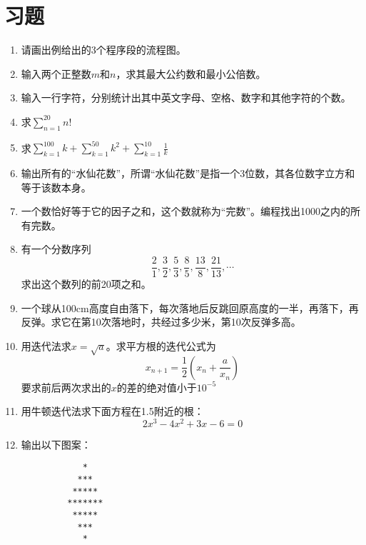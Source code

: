 \section{习题}
\begin{enumerate}
	\item 请画出例给出的3个程序段的流程图。
	\item 输入两个正整数$m$和$n$，求其最大公约数和最小公倍数。
	\item 输入一行字符，分别统计出其中英文字母、空格、数字和其他字符的个数。
	\item 求$\sum\limits_{n=1}^{20}n!$
	\item 求$\sum\limits_{k=1}^100 k + \sum\limits_{k=1}^50 k^2+\sum\limits_{k=1}^10 \frac{1}{k}$
	\item 输出所有的“水仙花数”，所谓“水仙花数”是指一个3位数，其各位数字立方和等于该数本身。
	\item 一个数恰好等于它的因子之和，这个数就称为“完数”。编程找出1000之内的所有完数。
	\item 有一个分数序列
		\begin{equation}
			\frac{2}{1},\frac{3}{2},\frac{5}{3},\frac{8}{5},\frac{13}{8},\frac{21}{13}, \cdots
		\end{equation}
		求出这个数列的前20项之和。
	\item 一个球从100cm高度自由落下，每次落地后反跳回原高度的一半，再落下，再反弹。求它在第10次落地时，共经过多少米，第10次反弹多高。
	\item 用迭代法求$x=\sqrt a$。求平方根的迭代公式为
		\begin{equation}
			x_{n+1} = \frac{1}{2}(x_n+\frac{a}{x_n})
		\end{equation}
		要求前后两次求出的$x$的差的绝对值小于$10^{-5}$
	\item 用牛顿迭代法求下面方程在1.5附近的根：
		\begin{equation}
			2x^3-4x^2+3x-6=0
		\end{equation}
	\item 输出以下图案：
		\begin{lstlisting}
		    *
		   ***
		  *****
		 *******
		  *****
		   ***
		    *
		\end{lstlisting}
\end{enumerate}
